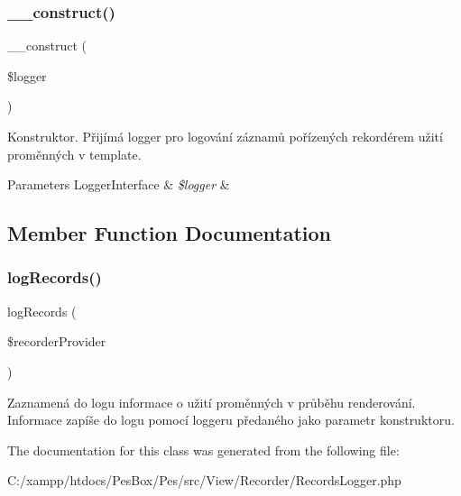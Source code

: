\subsubsection{\texorpdfstring{\+\_\+\+\_\+construct()}{\_\_construct()}}
{\footnotesize\ttfamily \+\_\+\+\_\+construct (\begin{DoxyParamCaption}\item[{Logger\+Interface}]{\$logger }\end{DoxyParamCaption})}

Konstruktor. Přijímá logger pro logování záznamů pořízených rekordérem užití proměnných v template. 
\begin{DoxyParams}[1]{Parameters}
Logger\+Interface & {\em \$logger} & \\
\hline
\end{DoxyParams}


\subsection{Member Function Documentation}
\mbox{\label{class_pes_1_1_view_1_1_recorder_1_1_records_logger_a8abb9ca59332646afa03e57f45262618}} 
\subsubsection{\texorpdfstring{log\+Records()}{logRecords()}}
{\footnotesize\ttfamily log\+Records (\begin{DoxyParamCaption}\item[{\mbox{\hyperlink{interface_pes_1_1_view_1_1_recorder_1_1_recorder_provider_interface}{Recorder\+Provider\+Interface}}}]{\$recorder\+Provider }\end{DoxyParamCaption})}

Zaznamená do logu informace o užití proměnných v průběhu renderování. Informace zapíše do logu pomocí loggeru předaného jako parametr konstruktoru. 

The documentation for this class was generated from the following file\+:\begin{DoxyCompactItemize}
\item 
C\+:/xampp/htdocs/\+Pes\+Box/\+Pes/src/\+View/\+Recorder/Records\+Logger.\+php\end{DoxyCompactItemize}

